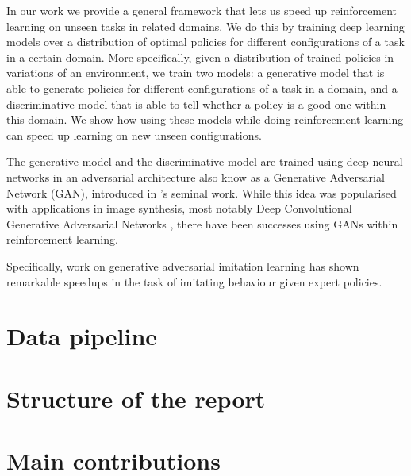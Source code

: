 In our work we provide a general framework that lets us speed up reinforcement learning on unseen tasks in related domains. We do this by training deep learning models over a distribution of optimal policies for different configurations of a task in a certain domain. More specifically, given a distribution of trained policies in variations of an environment, we train two models: a generative model that is able to generate policies for different configurations of a task in a domain, and a discriminative model that is able to tell whether a policy is a good one within this domain. We show how using these models while doing reinforcement learning can speed up learning on new unseen configurations.

The generative model and the discriminative model are trained using deep neural networks in an adversarial architecture also know as a Generative Adversarial Network (GAN), introduced in \cite{goodfellow2014generative}'s seminal work. While this idea was popularised with applications in image synthesis, most notably Deep Convolutional Generative Adversarial Networks \parencite{radford2015unsupervised}, there have been successes using GANs within reinforcement learning.

Specifically, work on generative adversarial imitation learning \parencite{ho2016generative} has shown remarkable speedups in the task of imitating behaviour given expert policies.


\section{Data pipeline}


\section{Structure of the report}


\section{Main contributions}


